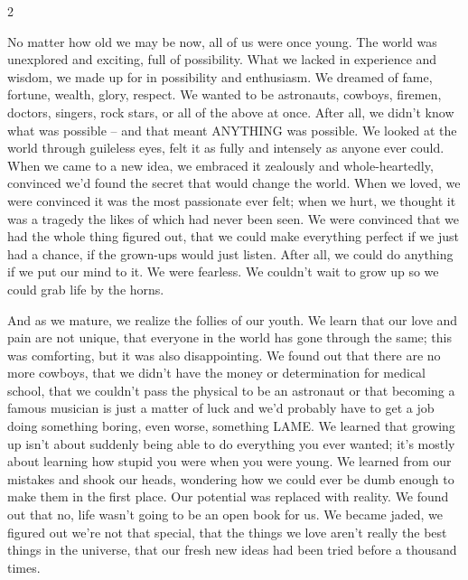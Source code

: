 \label{cha:introduction}

\begin{multicols}{2}

\noindent No matter how old we may be now, all of us were once young. The world was unexplored and exciting, full of possibility. What we lacked in experience and wisdom, we made up for in possibility and enthusiasm. We dreamed of fame, fortune, wealth, glory, respect. We wanted to be astronauts, cowboys, firemen, doctors, singers, rock stars, or all of the above at once. After all, we didn't know what was possible – and that meant ANYTHING was possible. We looked at the world through guileless eyes, felt it as fully and intensely as anyone ever could. When we came to a new idea, we embraced it zealously and whole-heartedly, convinced we'd found the secret that would change the world. When we loved, we were convinced it was the most passionate ever felt; when we hurt, we thought it was a tragedy the likes of which had never been seen. We were convinced that we had the whole thing figured out, that we could make everything perfect if we just had a chance, if the grown-ups would just listen. After all, we could do 
anything if we put our mind to it. We were fearless. We couldn't wait to grow up so we could grab life by the horns.

And as we mature, we realize the follies of our youth. We learn that our love and pain are not unique, that everyone in the world has gone through the same; this was comforting, but it was also disappointing. We found out that there are no more cowboys, that we didn't have the money or determination for medical school, that we couldn't pass the physical to be an astronaut or that becoming a famous musician is just a matter of luck and we'd probably have to get a job doing something boring, even worse, something LAME. We learned that growing up isn't about suddenly being able to do everything you ever wanted; it's mostly about learning how stupid you were when you were young. We learned from our mistakes and shook our heads, wondering how we could ever be dumb enough to make them in the first place. Our potential was replaced with reality. We found out that no, life wasn't going to be an open book for us. We became jaded, we figured out we're not that special, that the things we love aren't really the best things in the universe, that our fresh new ideas had been tried before a thousand times.


\end{multicols}
